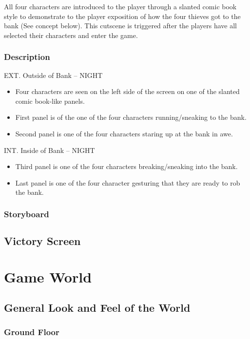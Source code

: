\documentclass[11pt]{report}
\begin{document}
All four characters are introduced to the player through a slanted comic book style to demonstrate to the player exposition of how the four thieves got to the bank (See concept below). This cutscene is triggered after the players have all selected their characters and enter the game.

\subsubsection{Description}

EXT. Outside of Bank -- NIGHT
\begin{itemize}
    \item Four characters are seen on the left side of the screen on one of the slanted comic book-like panels. 
    \item First panel is of the one of the four characters running/sneaking to the bank.
    \item Second panel is one of the four characters staring up at the bank in awe.
\end{itemize}
INT. Inside of Bank -- NIGHT
\begin{itemize}
    \item Third panel is one of the four characters breaking/sneaking into the bank.
    \item Last panel is one of the four character gesturing that they are ready to rob the bank.
\end{itemize}

\subsubsection{Storyboard}

\subsection{Victory Screen}

\section{Game World}

\subsection{General Look and Feel of the World}

\subsubsection{Ground Floor}
\end{document}
